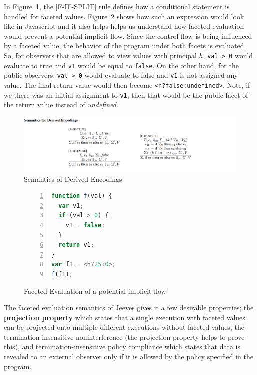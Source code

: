 In Figure~\ref{fig:fif}, the [F-IF-SPLIT] rule defines how a conditional statement
is handled for faceted values. Figure~\ref{fig:implicit flow} shows how such an
expression would look like in Javascript and it also helps helps us understand
how faceted evaluation would prevent a potential implicit flow. Since the control
flow is being influenced by a faceted value, the behavior of the program under both
facets is evaluated. So, for observers that are allowed to view values with principal
$h$, \texttt{val > 0} would evaluate to true and \texttt{v1} would be equal to
\texttt{false}. On the other hand, for the public observers, \texttt{val > 0} would
evaluate to false and \texttt{v1} is not assigned any value. The final return value
would then become \texttt{<h?false:undefined>}. Note, if we there was an initial
assignment to \texttt{v1}, then that would be the public facet of the return value
instead of \textit{undefined}.

\begin{figure}
	\centering
	\includegraphics[scale=0.275, frame]{images/fif.png}
	\caption{Semantics of Derived Encodings~\cite{FacetedJeeves}}
	\label{fig:fif}
\end{figure}

\begin{figure}
	\begin{lstlisting}[language=javascript,frame=single, breaklines=true,basicstyle=\footnotesize\ttfamily, numbers=left, extendedchars=true, tabsize=2]
function f(val) {
  var v1;
  if (val > 0) {
    v1 = false;
  }
  return v1;
}
var f1 = <h?25:0>;
f(f1);
\end{lstlisting}
\caption{Faceted Evaluation of a potential implicit flow}
\label{fig:implicit flow}
\end{figure}

The faceted evaluation semantics of Jeeves gives it a few desirable properties;
the \textbf{projection property} which states that a single execution with faceted
values can be projected onto multiple different executions without faceted values,
the termination-insensitive noninterference (the projection property helps to prove
this), and termination-insensitive policy compliance which states that data is revealed
to an external observer only if it is allowed by the policy specified in the program.

